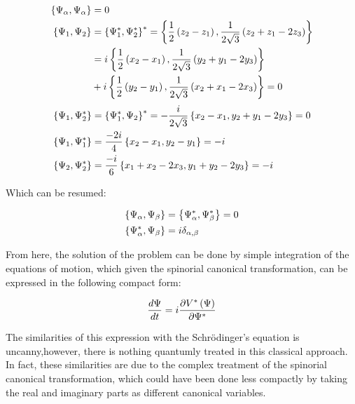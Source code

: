 \small
\begin{align*}
\left\lbrace \Psi_\alpha, \Psi_\alpha \right\rbrace &= 0\\ 
\left\lbrace \Psi_1, \Psi_2 \right\rbrace &= \left\lbrace \Psi_1^*, \Psi_2^* \right\rbrace^* = \left\lbrace \frac{1}{2}\left( z_{2}-z_{1} \right), \frac{1}{2\sqrt{3}}\left( z_{2}+z_{1}-2z_{3} \right) \right\rbrace \\
&= i\left\lbrace \frac{1}{2}\left( x_{2}-x_{1} \right), \frac{1}{2\sqrt{3}}\left( y_{2}+y_{1}-2y_{3} \right) \right\rbrace\\
&+ i\left\lbrace \frac{1}{2}\left( y_{2}-y_{1} \right), \frac{1}{2\sqrt{3}}\left( x_{2}+x_{1}-2x_{3} \right) \right\rbrace = 0\\
\end{align*}
\small
\begin{align*}
\left\lbrace \Psi_1, \Psi_2^* \right\rbrace &= \left\lbrace \Psi_1^*, \Psi_2 \right\rbrace^* = -\frac{i}{2\sqrt{3}}\left\lbrace x_{2}-x_{1}, y_{2}+y_{1}-2y_{3} \right\rbrace = 0\\
\left\lbrace \Psi_1, \Psi_1^* \right\rbrace &= \frac{-2i}{4}\left\lbrace x_{2}-x_{1}, y_2-y_1 \right\rbrace = -i\\
\left\lbrace \Psi_2, \Psi_2^* \right\rbrace &= \frac{-i}{6}\left\lbrace x_{1}+x_{2}-2x_3, y_1+y_2-2y_3 \right\rbrace = -i
\end{align*}
\normalsize

Which can be resumed:

\begin{align}
\left\lbrace \Psi_\alpha, \Psi_\beta \right\rbrace &= \left\lbrace \Psi_\alpha^*, \Psi_\beta^* \right\rbrace = 0\\
\left\lbrace \Psi_\alpha^*, \Psi_\beta \right\rbrace &= i\delta_{\alpha,\beta}
\label{eq:canonicalSpinor}
\end{align}

From here, the solution of the problem can be done by simple integration of the equations of motion, which given the spinorial canonical transformation, can be expressed in the following compact form:

\begin{equation}
\frac{d\Psi}{dt} = i\frac{\partial V^*\left( \Psi \right)}{\partial\Psi^*}
\end{equation}

The similarities of this expression with the Schr\"odinger's equation is uncanny,however, there is nothing quantumly treated in this classical approach. In fact, these similarities are due to the complex treatment of the spinorial canonical transformation, which could have been done  less compactly by taking the real and imaginary parts as different canonical variables.\\



